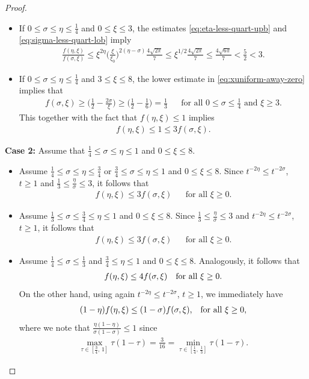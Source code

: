 \documentclass[12pt, reqno]{amsart}%
\theoremstyle{plain}  %
\theoremstyle{definition}  %
\theoremstyle{remark}
\numberwithin{equation}{section}
\begin{document}
\begin{proof}
\begin{itemize}
\item
If $0\leq \sigma\leq \eta\leq \frac{1}{4}$ and $0\leq \xi\leq 3$, the estimates \eqref{eq:eta-less-quart-upb} and \eqref{eq:sigma-less-quart-lob} imply
\begin{align*}
\frac{f(\eta,\xi) }{f(\sigma,\xi)}\leq\xi^{2\eta} \big(\frac{\xi}{\xi_0}\big)^{2(\eta-\sigma)}
\frac{4\sqrt{2\pi}}{7}\leq \xi^{1/2}
\frac{4\sqrt{2\pi}}{7}\leq \frac{4\sqrt{6\pi}}{7}<\frac{5}{2}<3.
\end{align*}
\item If $0\leq \sigma\leq  \eta\leq\frac{1}{4}$
and $3\leq \xi\leq 8$, the lower estimate  in \eqref{eq:xuniform-away-zero} implies that
\begin{align}\label{eq:sigma-less-quart-lob-bis}
f(\sigma,\xi)\geq\big( \frac{1}{2}-\frac{2\sigma}{\xi}\big)\geq \big( \frac{1}{2}-\frac{1}{6}\big)=\frac{1}{3}&& \text{for all $0\leq \sigma\leq \frac{1}{4}$ and $\xi\geq 3$}.
\end{align}
This together with the fact that $ f(\eta,\xi) \leq 1$ implies
\begin{align*}
f(\eta,\xi) \leq 1\leq3f(\sigma,\xi).
\end{align*}
\end{itemize}
\textbf{Case 2: } Assume  that $\frac{1}{4}\leq\sigma\leq \eta\leq 1$ and $0\leq \xi\leq 8$.
\begin{itemize}
\item Assume $\frac{1}{4}\leq\sigma\leq \eta\leq \frac{3}{4}$ or  $\frac{3}{4}\leq\sigma\leq \eta\leq 1$ and $0\leq \xi\leq 8$. Since $t^{-2\eta}\leq t^{-2\sigma} $, $t\geq 1$ and $\frac{1}{3}\leq \frac{\eta}{\sigma} \leq 3$, it follows that
\begin{align*}
f(\eta,\xi)\leq 3f(\sigma,\xi)  && \text{for all $\xi\geq 0$}.
\end{align*}
\item Assume $\frac{1}{3}\leq\sigma\leq  \frac{3}{4}\leq \eta\leq 1$ and $0\leq \xi\leq 8$. Since  $\frac{1}{3}\leq \frac{\eta}{\sigma} \leq 3$ and $t^{-2\eta}\leq t^{-2\sigma} $, $t\geq 1$, it follows that
\begin{align*}
f(\eta,\xi)\leq 3f(\sigma,\xi)  && \text{for all $\xi\geq 0$}.
\end{align*}
\item  Assume  $\frac{1}{4}\leq\sigma\leq \frac{1}{3}$ and $ \frac{3}{4}\leq \eta\leq 1$  and $0\leq \xi\leq 8$. Analogously, it follows that
\begin{align*}
f(\eta,\xi)\leq 4f(\sigma,\xi)  && \text{for all $ \xi\geq 0$}.
\end{align*}
On the other hand, using again  $t^{-2\eta}\leq t^{-2\sigma}$, $t\geq1$, we immediately have
\begin{align*}
(1-\eta) f(\eta, \xi)\leq (1-\sigma) f(\sigma,\xi),&& \text{for all $ \xi\geq 0$},
\end{align*}
where we note that $\frac{\eta(1-\eta)}{\sigma(1-\sigma)}\leq 1$ since
\begin{align*}
\max_{\tau\in\left[\frac{3}{4},\,1\right]} \tau(1-\tau)
= \frac{3}{16} =
\min_{\tau\in\left[\frac{1}{4},\,\frac{1}{3}\right]} \tau(1-\tau).
\end{align*}


\end{itemize}
\end{proof}
\end{document}
